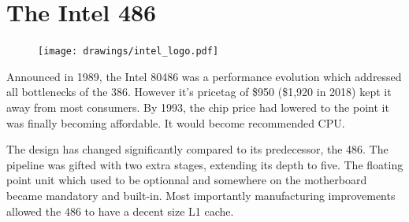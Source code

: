 \section{The Intel 486}

\begin{figure}
\centering
\texttt{[image: drawings/intel\_logo.pdf]}
\end{figure}

Announced in 1989, the Intel 80486 was a performance evolution which addressed all bottlenecks of the 386. However it's pricetag of \$950 (\$1,920 in 2018) kept it away from most consumers. By 1993, the chip price had lowered to the point it was finally becoming affordable. It would become \doom recommended CPU.\\
\par
The design has changed significantly compared to its predecessor, the 486. The pipeline was gifted with two extra stages, extending its depth to five. The floating point unit which used to be optionnal and somewhere on the motherboard became mandatory and built-in. Most importantly manufacturing improvements allowed the 486 to have a decent size L1 cache.\\
\par
{}\\
\par

